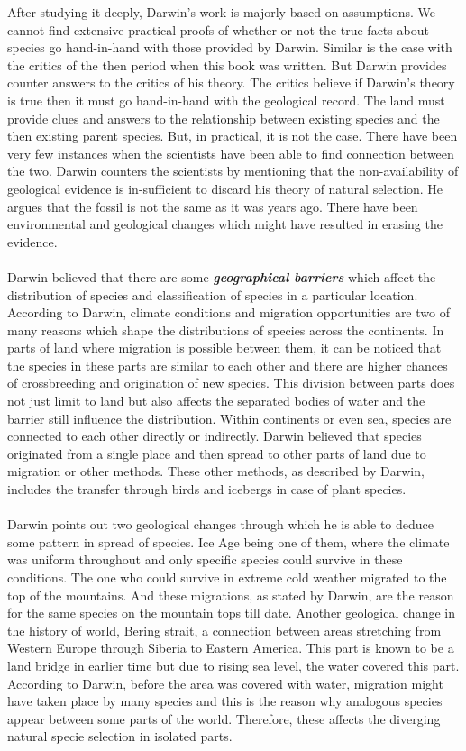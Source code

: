 \documentclass{article}
\begin{document}
	After studying it deeply, Darwin's work is majorly based on assumptions. We cannot find extensive practical proofs of whether or not the true facts about species go hand-in-hand with those provided by Darwin. Similar is the case with the critics of the then period when this book was written. But Darwin provides counter answers to the critics of his theory. The critics believe if Darwin's theory is true then it must go hand-in-hand with the geological record. The land must provide clues and answers to the relationship between existing species and the then existing parent species. But, in practical, it is not the case. There have been very few instances when the scientists have been able to find connection between the two. Darwin counters the scientists by mentioning that the non-availability of geological evidence is in-sufficient to discard his theory of natural selection. He argues that the fossil is not the same as it was years ago. There have been environmental and geological changes which might have resulted in erasing the evidence. \\ \\
	Darwin believed that there are some \textbf{\textit{geographical barriers}} which affect the distribution of species and classification of species in a particular location. According to Darwin, climate conditions and migration opportunities are two of many reasons which shape the distributions of species across the continents. In parts of land where migration is possible between them, it can be noticed that the species in these parts are similar to each other and there are higher chances of crossbreeding and origination of new species. This division between parts does not just limit to land but also affects the separated bodies of water and the barrier still influence the distribution. Within continents or even sea, species are connected to each other directly or indirectly. Darwin believed that species originated from a single place and then spread to other parts of land due to migration or other methods. These other methods, as described by Darwin, includes the transfer through birds and icebergs in case of plant species. \\ \\
	Darwin points out two geological changes through which he is able to deduce some pattern in spread of species. Ice Age being one of them, where the climate was uniform throughout and only specific species could survive in these conditions. The one who could survive in extreme cold weather migrated to the top of the mountains. And these migrations, as stated by Darwin, are the reason for the same species on the mountain tops till date. Another geological change in the history of world, Bering strait, a connection between areas stretching from Western Europe through Siberia to Eastern America. This part is known to be a land bridge in earlier time but due to rising sea level, the water covered this part. According to Darwin, before the area was covered with water, migration might have taken place by many species and this is the reason why analogous species appear between some parts of the world. Therefore, these affects the diverging natural specie selection in isolated parts. \\ \\
\end{document}
